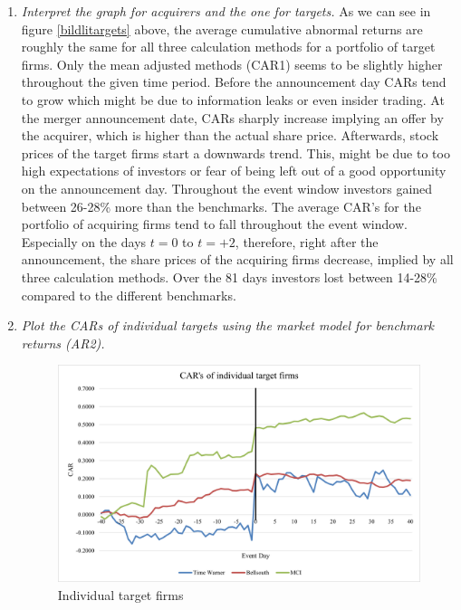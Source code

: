 \begin{enumerate}[label=\alph*),leftmargin=*]
\item \textit{Interpret the graph for acquirers and the one for targets.} \newline
As we can see in figure \ref{bildlitargets} above, the average cumulative abnormal returns are roughly the same for all three calculation methods for a portfolio of target firms. Only the mean adjusted methods (CAR1) seems to be slightly higher throughout the given time period. Before the announcement day CARs tend to grow which might be due to information leaks or even insider trading. At the merger announcement date, CARs sharply increase implying an offer by the acquirer, which is higher than the actual share price. Afterwards, stock prices of the target firms start a downwards trend. This, might be due to too high expectations of investors or fear of being left out of a good opportunity on the announcement day. Throughout the event window investors gained between 26-28\% more than the benchmarks. \newline
The average CAR’s for the portfolio of acquiring firms tend to fall throughout the event window. Especially on the days $t=0$ to $t=+2$, therefore, right after the announcement, the share prices of the acquiring firms decrease, implied by all three calculation methods. Over the 81 days investors lost between 14-28\% compared to the different benchmarks. \newpage

\item \textit{Plot the CARs of individual targets using the market model for benchmark returns (AR2).} \newline
\begin{figure}[H]
    \centering
    \includegraphics[scale=0.75]{images/Bild3.png}
    \caption{Individual target firms}
    \label{Individualtargetfirm3}
\end{figure}


\end{enumerate}
